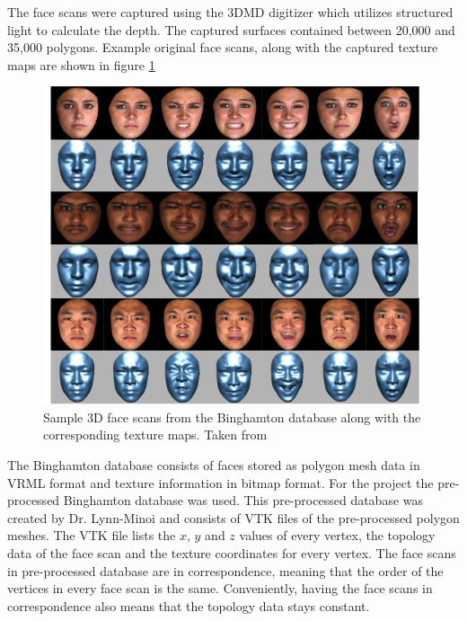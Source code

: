 \documentclass[11pt,a4paper]{report}
\begin{document}
The face scans were captured using the 3DMD digitizer which utilizes structured light to
calculate the depth. The captured surfaces contained between 20,000 and 35,000
polygons. Example original face scans, along with the captured texture maps are
shown in figure \ref{fg:binghamton} 

\begin{figure}[H]
\begin{centering}
\includegraphics[scale=0.80]{images/binghamton.png}
\par\end{centering}

\caption{Sample 3D face scans from the Binghamton database along with the
  corresponding texture maps. Taken from \cite{binghamton}}
\label{fg:binghamton}

\end{figure}
\clearpage

The Binghamton database consists of faces stored as polygon mesh data in VRML
format and texture information in bitmap format. For the project the pre-processed Binghamton
database was used. This pre-processed database was created by Dr. Lynn-Minoi
\cite{jacey} and consists of VTK files of the pre-processed polygon meshes. The
VTK file lists the $x$, $y$ and $z$ values of every vertex, the topology data
of the face scan and the texture coordinates for every vertex. The face scans in
pre-processed database are in correspondence, meaning that the order of the
vertices in every face scan is the same. Conveniently, having the face scans in
correspondence also means that the topology data stays constant.
\end{document}
